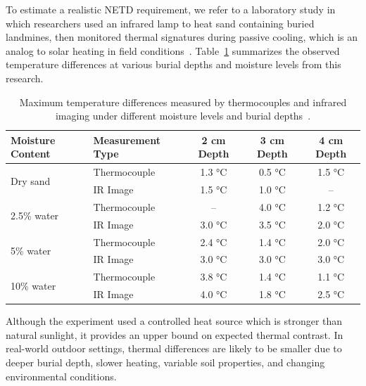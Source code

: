 To estimate a realistic \gls{NETD} requirement, we refer to a laboratory study in which researchers used an infrared lamp to heat sand containing buried landmines, then monitored thermal signatures during passive cooling, which is an analog to solar heating in field conditions~\cite{lamorski2002thermal}. Table~\ref{tab:netd_table} summarizes the observed temperature differences at various burial depths and moisture levels from this research.


\begin{table}[htbp]
    \centering
    \footnotesize
    \renewcommand{\arraystretch}{1.1}
    \setlength{\tabcolsep}{6pt}
    \begin{tabular}{@{}llccc@{}}
        \toprule
        \textbf{Moisture Content} & \textbf{Measurement Type} & \textbf{2 cm Depth} & \textbf{3 cm Depth} & \textbf{4 cm Depth} \\
        \midrule
        \multirow{2}{*}{Dry sand} 
            & Thermocouple & 1.3 °C & 0.5 °C & 1.5 °C \\
            & IR Image     & 1.5 °C & 1.0 °C & -- \\
        \midrule
        \multirow{2}{*}{2.5\% water} 
            & Thermocouple & --     & 4.0 °C & 1.2 °C \\
            & IR Image     & 3.0 °C & 3.5 °C & 2.0 °C \\
        \midrule
        \multirow{2}{*}{5\% water} 
            & Thermocouple & 2.4 °C & 1.4 °C & 2.0 °C \\
            & IR Image     & 3.0 °C & 3.0 °C & 3.0 °C \\
        \midrule
        \multirow{2}{*}{10\% water} 
            & Thermocouple & 3.8 °C & 1.4 °C & 1.1 °C \\
            & IR Image     & 4.0 °C & 1.8 °C & 2.5 °C \\
        \bottomrule
    \end{tabular}
    \caption[Max temperature differences by depth and moisture]{Maximum temperature differences measured by thermocouples and infrared imaging under different moisture levels and burial depths~\cite{lamorski2002thermal}.}
    \label{tab:netd_table}
\end{table}



Although the experiment used a controlled heat source which is stronger than natural sunlight, it provides an upper bound on expected thermal contrast. In real-world outdoor settings, thermal differences are likely to be smaller due to deeper burial depth, slower heating, variable soil properties, and changing environmental conditions.

